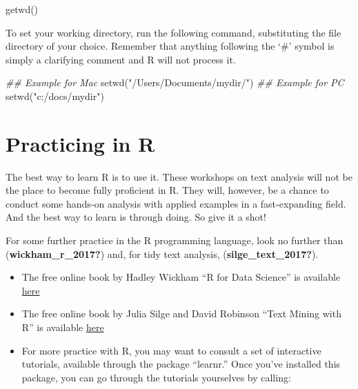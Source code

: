 \documentclass[
  letterpaper,
  DIV=11,
  numbers=noendperiod]{scrreprt}
\newenvironment{Shaded}{\begin{snugshade}}{\end{snugshade}}
\newcommand{\DocumentationTok}[1]{\textcolor[rgb]{0.37,0.37,0.37}{\textit{#1}}}
\newcommand{\FunctionTok}[1]{\textcolor[rgb]{0.28,0.35,0.67}{#1}}
\newcommand{\NormalTok}[1]{\textcolor[rgb]{0.00,0.23,0.31}{#1}}
\newcommand{\StringTok}[1]{\textcolor[rgb]{0.13,0.47,0.30}{#1}}
\begin{document}
\begin{Shaded}
\begin{Highlighting}[]
\FunctionTok{getwd}\NormalTok{()}
\end{Highlighting}
\end{Shaded}

To set your working directory, run the following command, substituting
the file directory of your choice. Remember that anything following the
`\#' symbol is simply a clarifying comment and R will not process it.

\begin{Shaded}
\begin{Highlighting}[]
\DocumentationTok{\#\# Example for Mac }
\FunctionTok{setwd}\NormalTok{(}\StringTok{"/Users/Documents/mydir/"}\NormalTok{) }
\DocumentationTok{\#\# Example for PC }
\FunctionTok{setwd}\NormalTok{(}\StringTok{"c:/docs/mydir"}\NormalTok{) }
\end{Highlighting}
\end{Shaded}

\hypertarget{practicing-in-r}{%
\section*{Practicing in R}\label{practicing-in-r}}

The best way to learn R is to use it. These workshops on text analysis
will not be the place to become fully proficient in R. They will,
however, be a chance to conduct some hands-on analysis with applied
examples in a fast-expanding field. And the best way to learn is through
doing. So give it a shot!

For some further practice in the R programming language, look no further
than (\textbf{wickham\_r\_2017?}) and, for tidy text analysis,
(\textbf{silge\_text\_2017?}).

\begin{itemize}
\item
  The free online book by Hadley Wickham ``R for Data Science'' is
  available \href{https://r4ds.had.co.nz/}{here}
\item
  The free online book by Julia Silge and David Robinson ``Text Mining
  with R'' is available \href{https://www.tidytextmining.com/}{here}
\item
  For more practice with R, you may want to consult a set of interactive
  tutorials, available through the package ``learnr.'' Once you've
  installed this package, you can go through the tutorials yourselves by
  calling:
\end{itemize}
\end{document}
